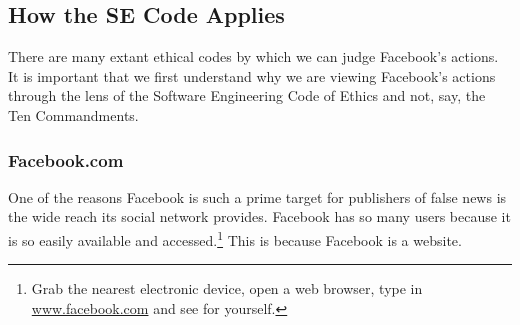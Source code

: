 
\subsection{How the SE Code Applies}

\par There are many extant ethical codes by which we can judge Facebook's actions. It is important that we first understand why we are viewing Facebook's actions through the lens of the Software Engineering Code of Ethics and not, say, the Ten Commandments.





\subsubsection{Facebook.com}

\par One of the reasons Facebook is such a prime target for publishers of false news is the wide reach its social network provides. \cite{telegraph_fn} Facebook has so many users because it is so easily available and accessed.\footnote{Grab the nearest electronic device, open a web browser, type in \url{www.facebook.com} and see for yourself.} This is because Facebook is a website.

